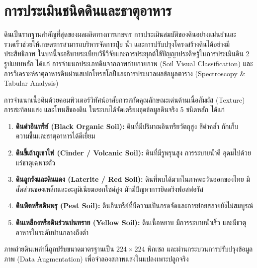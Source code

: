 \chapter{การประเมินชนิดดินและธาตุอาหาร}
\label{ch:soil_analysis}

ดินเป็นรากฐานสำคัญที่สุดของผลผลิตทางการเกษตร การประเมินสมบัติของดินอย่างแม่นยำและรวดเร็วช่วยให้เกษตรกรสามารถบริหารจัดการปุ๋ย น้ำ และการปรับปรุงโครงสร้างดินได้อย่างมีประสิทธิภาพ ในบทนี้จะอธิบายระเบียบวิธีวิจัยและการประยุกต์ใช้ปัญญาประดิษฐ์ในการประเมินดิน 2 รูปแบบหลัก ได้แก่ การจำแนกประเภทดินจากภาพถ่ายกายภาพ (Soil Visual Classification) และการวิเคราะห์ธาตุอาหารดินผ่านสเปกโทรสโกปีและการประมวลผลข้อมูลตาราง (Spectroscopy \& Tabular Analysis)

\label{sec:soil_types_cv}

การจำแนกเนื้อดินด้วยคอมพิวเตอร์วิทัศน์อาศัยการสกัดคุณลักษณะเด่นด้านเนื้อสัมผัส (Texture) การสะท้อนแสง และโทนสีของดิน ในระบบได้จัดเตรียมชุดข้อมูลดินจริง 5 ชนิดหลัก ได้แก่

\begin{enumerate}
    \item \textbf{ดินดำอินทรีย์ (Black Organic Soil):} ดินที่มีปริมาณอินทรียวัตถุสูง สีดำคล้ำ กักเก็บความชื้นและธาตุอาหารได้ดีเยี่ยม
    \item \textbf{ดินขี้เถ้าภูเขาไฟ (Cinder / Volcanic Soil):} ดินที่มีรูพรุนสูง การระบายน้ำดี อุดมไปด้วยแร่ธาตุเฉพาะตัว
    \item \textbf{ดินลูกรังและดินแดง (Laterite / Red Soil):} ดินที่พบได้มากในภาคตะวันออกของไทย มีสัดส่วนของเหล็กและอะลูมิเนียมออกไซด์สูง มักมีปัญหาการยึดตรึงฟอสฟอรัส
    \item \textbf{ดินพีตหรือดินพรุ (Peat Soil):} ดินอินทรีย์ที่มีความเป็นกรดจัดและการย่อยสลายยังไม่สมบูรณ์
    \item \textbf{ดินเหลืองหรือดินร่วนปนทราย (Yellow Soil):} ดินเนื้อหยาบ มีการระบายน้ำเร็ว และมีธาตุอาหารในระดับปานกลางถึงต่ำ
\end{enumerate}

ภาพถ่ายดินเหล่านี้ถูกปรับขนาดมาตรฐานเป็น $224 \times 224$ พิกเซล และผ่านกระบวนการปรับปรุงข้อมูลภาพ (Data Augmentation) เพื่อจำลองสภาพแสงในแปลงเพาะปลูกจริง

\label{sec:two_stage_cv_preprocessing}

